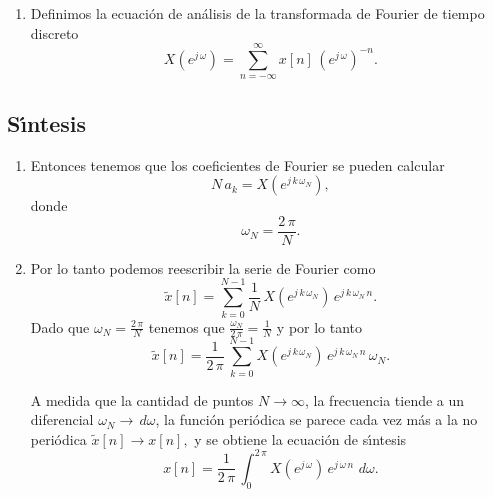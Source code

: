 \begin{enumerate}
\item   Definimos la ecuaci\'{o}n de an\'{a}lisis de la transformada de Fourier de tiempo discreto
\begin{equation}
    X\left( e^{j \, \omega }\right) = \sum_{n=-\infty }^{\infty }x\left[ n\right] \, \left(e^{j \, \omega}\right)^{-n}.
\end{equation}

\end{enumerate}

\subsection{S\'{\i}ntesis}

\begin{enumerate}
\item Entonces tenemos que los coeficientes de Fourier se pueden calcular
\begin{equation}
  N \, a_{k}= X\left( e^{j \, k \, \omega_{N}}\right),
\end{equation}
donde 
\begin{equation}
 \omega_{N} = \frac{2 \, \pi}{N}.
\end{equation}

\item   Por lo tanto podemos reescribir la serie de Fourier como
\begin{equation}
  \tilde{x}\left[ n\right] =
  \sum_{k=0}^{N-1}\frac{1}{N} \, X\left(e^{j \, k \, \omega_{N}}\right) \, e^{j \, k \, \omega_{N} \, n}.
\end{equation}
Dado que $\omega_{N} = \frac{2 \, \pi}{N}$ tenemos que $\frac{\omega_{N}}{2 \, \pi}=\frac{1}{N}$ y por lo tanto 
\begin{equation}
  \tilde{x}\left[ n\right] =
  \frac{1}{2 \, \pi} \, \sum_{k=0}^{N-1}X\left(e^{j \, k \, \omega_{N}}\right) \, e^{j \, k \, \omega_{N} \, n} \, \omega_{N}.
\end{equation}

A medida que la cantidad de puntos $N\rightarrow \infty$, 
la frecuencia tiende a un diferencial $\omega_{N}\rightarrow \, d\omega$, 
la funci\'{o}n peri\'{o}dica se parece cada vez m\'{a}s a la no peri\'{o}dica
$\tilde{x}\left[ n\right] \rightarrow x\left[ n\right],$ y 
se obtiene la ecuaci\'{o}n de s\'{\i}ntesis 
\begin{equation}
  x\left[ n\right] =
  \frac{1}{2 \, \pi } \, \int_{0}^{2 \, \pi } X\left( e^{j \, \omega }\right) \, e^{j \, \omega \, n} \, \, d\omega .
\end{equation}
\end{enumerate}

